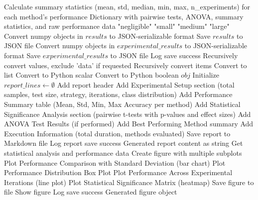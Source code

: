 \begin{algorithm}[!htbp]
\begin{algorithmic}[1]
    \EndIf
    \State Calculate summary statistics (mean, std, median, min, max, n\_experiments) for each method's performance
    \Return Dictionary with pairwise tests, ANOVA, summary statistics, and raw performance data
\EndProcedure
\Statex
{}
     \Return "negligible"
     \Return "small"
     \Return "medium"
    \Else \Return "large"
    \EndIf
\EndFunction
\Statex
{}
    \State Convert numpy objects in $results$ to JSON-serializable format
    \State Save $results$ to JSON file
\EndProcedure
\Statex
{}
    \State Convert numpy objects in $experimental\_results$ to JSON-serializable format
    \State Save $experimental\_results$ to JSON file
    \State Log save success
\EndProcedure
\Statex
{}
     Recursively convert values, exclude 'data' if requested
     Recursively convert items
     Convert to list
     Convert to Python scalar
     Convert to Python boolean
    \Else \Return $obj$
    \EndIf
\EndFunction
\Statex
{}
    \State Initialize $report\_lines \leftarrow \emptyset$
    \State Add report header
    \State Add Experimental Setup section (total samples, test size, strategy, iterations, class distribution)
    \State Add Performance Summary table (Mean, Std, Min, Max Accuracy per method)
    \State Add Statistical Significance Analysis section (pairwise t-tests with p-values and effect sizes)
    \State Add ANOVA Test Results (if performed)
    \State Add Best Performing Method summary
    \State Add Execution Information (total duration, methods evaluated)
    \State Save report to Markdown file
    \State Log report save success
    \Return Generated report content as string
\EndProcedure
\Statex
{}
    \State Get statistical analysis and performance data
    \State Create figure with multiple subplots
    \State Plot Performance Comparison with Standard Deviation (bar chart)
    \State Plot Performance Distribution Box Plot
    \State Plot Performance Across Experimental Iterations (line plot)
    \State Plot Statistical Significance Matrix (heatmap)
    \State Save figure to file
    \State Show figure
    \State Log save success
    \Return Generated figure object
\EndProcedure
\end{algorithmic}
\end{algorithm}

